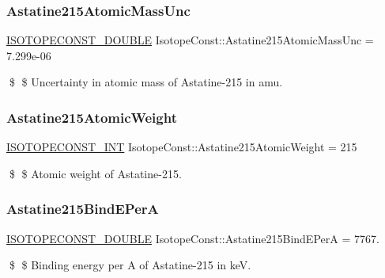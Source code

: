 \subsubsection{\texorpdfstring{Astatine215\+Atomic\+Mass\+Unc}{Astatine215AtomicMassUnc}}
{\footnotesize\ttfamily \mbox{\hyperlink{group___isotope_const-_macros_ga8f45a7272ce02c0b4c65c44636ed719a}{I\+S\+O\+T\+O\+P\+E\+C\+O\+N\+S\+T\+\_\+\+D\+O\+U\+B\+LE}} Isotope\+Const\+::\+Astatine215\+Atomic\+Mass\+Unc = 7.\+299e-\/06}

\$ \$ Uncertainty in atomic mass of Astatine-\/215 in amu. \mbox{\label{group___isotope_const-_astatine-_at215_ga1788da5e10db7eee8e2e920ee036b8d0}} 
\subsubsection{\texorpdfstring{Astatine215\+Atomic\+Weight}{Astatine215AtomicWeight}}
{\footnotesize\ttfamily \mbox{\hyperlink{group___isotope_const-_macros_ga5f18360b3e99483a35c32d789e62621c}{I\+S\+O\+T\+O\+P\+E\+C\+O\+N\+S\+T\+\_\+\+I\+NT}} Isotope\+Const\+::\+Astatine215\+Atomic\+Weight = 215}

\$ \$ Atomic weight of Astatine-\/215. \mbox{\label{group___isotope_const-_astatine-_at215_ga197eb68e8959f07a9834db8d2c1a4268}} 
\subsubsection{\texorpdfstring{Astatine215\+Bind\+E\+PerA}{Astatine215BindEPerA}}
{\footnotesize\ttfamily \mbox{\hyperlink{group___isotope_const-_macros_ga8f45a7272ce02c0b4c65c44636ed719a}{I\+S\+O\+T\+O\+P\+E\+C\+O\+N\+S\+T\+\_\+\+D\+O\+U\+B\+LE}} Isotope\+Const\+::\+Astatine215\+Bind\+E\+PerA = 7767.}

\$ \$ Binding energy per A of Astatine-\/215 in keV. \mbox{\label{group___isotope_const-_astatine-_at215_ga53d4ba3b47b0b7a1ec07cb9290adbc09}} 
